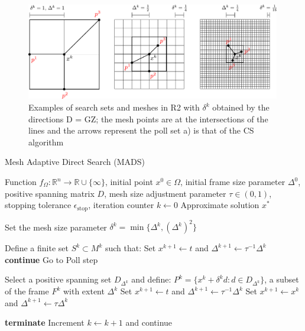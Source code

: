 \begin{figure}[H]
	\centering
	\includegraphics[width=0.99\textwidth]{figures/mads.pdf}
	\caption{Examples of search sets and meshes in R2 with
		$\delta^k$  obtained by the directions D = GZ; the mesh points
		are at the intersections of the lines and the arrows represent
		the poll set a) is that of the CS algorithm}
	\label{fig:gps}
\end{figure}



\begin{algorithm}[H]
	\caption{Mesh Adaptive Direct Search (MADS)}\label{MADS}
	\begin{algorithmic}[1]
		\Require Function $f_{\Omega}: \mathbb{R}^n \to \mathbb{R} \cup \{\infty\}$, initial point $x^0 \in \Omega$, initial frame size parameter $\Delta^0$, positive spanning matrix $D$, mesh size adjustment parameter $\tau \in (0,1)$, stopping tolerance $\epsilon_{\text{stop}}$, iteration counter $k \gets 0$
		\Ensure Approximate solution $x^*$
		
		
		
		\State Set the mesh size parameter $\delta^k = \min \{\Delta^k, (\Delta^k)^2\}$
		
		\State Define a finite set $S^k \subset M^k$ such that:
		\State Set $x^{k+1} \gets t$ and $\Delta^{k+1} \gets \tau^{-1}\Delta^k$
		\State \textbf{continue}
		\Else
		\State Go to Poll step
		\EndIf
		
		\State Select a positive spanning set $D_{\Delta^k}$ and define:
		\State $P^k = \{x^k + \delta^k d : d \in D_{\Delta^k}\}$, a subset of the frame $F^k$ with extent $\Delta^k$
		\State Set $x^{k+1} \gets t$ and $\Delta^{k+1} \gets \tau^{-1}\Delta^k$
		\Else
		\State Set $x^{k+1} \gets x^k$ and $\Delta^{k+1} \gets \tau\Delta^k$
		\EndIf
		
		\State \textbf{terminate}
		\Else
		\State Increment $k \gets k+1$ and continue
		\EndIf
		
		\EndWhile
		\EndProcedure
	\end{algorithmic}
\end{algorithm}